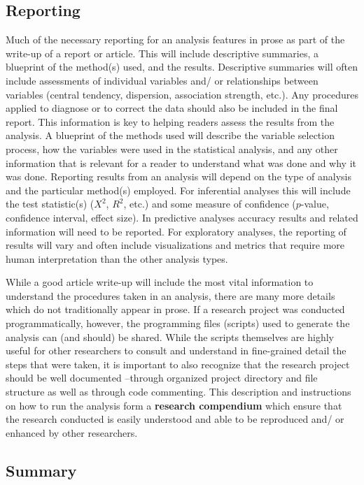 \documentclass[
]{article}
\begin{document}
\hypertarget{reporting}{%
\subsection{Reporting}\label{reporting}}

Much of the necessary reporting for an analysis features in prose as part of the write-up of a report or article. This will include descriptive summaries, a blueprint of the method(s) used, and the results. Descriptive summaries will often include assessments of individual variables and/ or relationships between variables (central tendency, dispersion, association strength, etc.). Any procedures applied to diagnose or to correct the data should also be included in the final report. This information is key to helping readers assess the results from the analysis. A blueprint of the methods used will describe the variable selection process, how the variables were used in the statistical analysis, and any other information that is relevant for a reader to understand what was done and why it was done. Reporting results from an analysis will depend on the type of analysis and the particular method(s) employed. For inferential analyses this will include the test statistic(s) (\(X^2\), \(R^2\), etc.) and some measure of confidence (\(p\)-value, confidence interval, effect size). In predictive analyses accuracy results and related information will need to be reported. For exploratory analyses, the reporting of results will vary and often include visualizations and metrics that require more human interpretation than the other analysis types.

While a good article write-up will include the most vital information to understand the procedures taken in an analysis, there are many more details which do not traditionally appear in prose. If a research project was conducted programmatically, however, the programming files (scripts) used to generate the analysis can (and should) be shared. While the scripts themselves are highly useful for other researchers to consult and understand in fine-grained detail the steps that were taken, it is important to also recognize that the research project should be well documented --through organized project directory and file structure as well as through code commenting. This description and instructions on how to run the analysis form a \textbf{research compendium} which ensure that the research conducted is easily understood and able to be reproduced and/ or enhanced by other researchers.

\hypertarget{summary-2}{%
\subsection*{Summary}\label{summary-2}}
\end{document}
